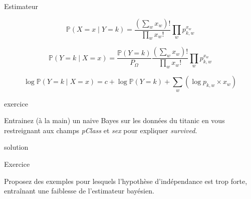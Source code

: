 \documentclass[11pt]{beamer}
\newcommand{\Pythonsmall}[1]{
	{\scriptsize }
}
\begin{document}
\begin{frame}{Estimateur}

$$\mathbb{P}(X=x \mid Y=k) = \frac{(\sum_w x_w)!}{\prod_w x_w !}\prod_w p_{k,w}^{x_w} $$

\pause

$$\mathbb{P}(Y=k \mid X=x) = \frac{\mathbb{P}(Y=k)}{P_{\Omega}} \frac{(\sum_w x_w)!}{\prod_w x_w !}\prod_w p_{k,w}^{x_w} $$

\pause

$$\log \mathbb{P}(Y=k \mid X=x) = c + \log \mathbb{P}(Y=k) + \sum_w \left(\log p_{k,w} \times x_w\right) $$

\end{frame}


\begin{frame}{exercice}

Entrainez (à la main) un naive Bayes sur les données du titanic en vous restreignant aux champs \textit{pClass} et \textit{sex} pour expliquer \textit{survived}.

\end{frame}

\begin{frame}{solution}
\Pythonsmall{ext10}
\end{frame}

\begin{frame}{Exercice}

Proposez des exemples pour lesquels l'hypothèse d'indépendance est trop forte, entraînant une faiblesse de l'estimateur bayésien.

\end{frame}
\end{document}
